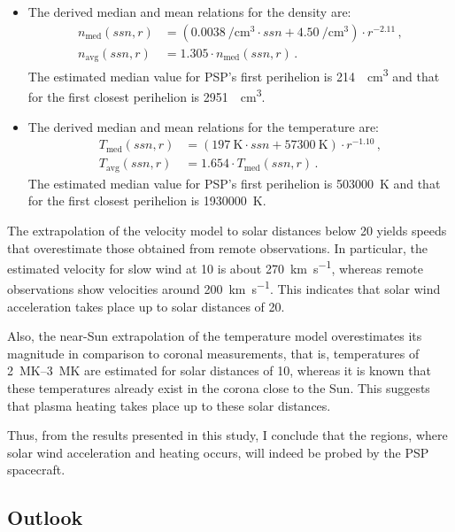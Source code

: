 \begin{itemize}
	\item The derived median and mean relations for the density are:
	\begin{align*}
		n_\text{med}(ssn,r) &= \left(\SI{0.0038}{\per\cm\cubed} \cdot ssn + \SI{4.50}{\per\cm\cubed}\right) \cdot r^{-2.11}	\,,\\
		n_\text{avg}(ssn,r) &= 1.305 \cdot n_\text{med}(ssn,r)	\,.
	\end{align*}
	 The estimated median value for PSP's first perihelion is \SI{214}{\per\cm\cubed} and that for the first closest perihelion is \SI{2951}{\per\cm\cubed}.
	
	\item The derived median and mean relations for the temperature are:
	\begin{align*}
		T_\text{med}(ssn,r) &= (\SI{197}{\K} \cdot ssn + \SI{57300}{\K}) \cdot r^{-1.10}	\,,\\
		T_\text{avg}(ssn,r) &= 1.654 \cdot T_\text{med}(ssn,r)\,.
	\end{align*}
	 The estimated median value for PSP's first perihelion is \SI{503000}{\kelvin} and that for the first closest perihelion is \SI{1930000}{\kelvin}.
\end{itemize}

\bigskip

The extrapolation of the velocity model to solar distances below \SI{20}{\Rs} yields speeds that overestimate those obtained from remote observations. In particular, the estimated velocity for slow wind at \SI{10}{\Rs} is about \SI{270}{\km\per\s}, whereas remote observations show velocities around \SI{200}{\km\per\s}. This indicates that solar wind acceleration takes place up to solar distances of \SI{20}{\Rs}.

Also, the near-Sun extrapolation of the temperature model overestimates its magnitude in comparison to coronal measurements, that is, temperatures of \SIrange{2}{3}{\mega\kelvin} are estimated for solar distances of \SI{10}{\Rs}, whereas it is known that these temperatures already exist in the corona close to the Sun. This suggests that plasma heating takes place up to these solar distances.

Thus, from the results presented in this study, I conclude that the regions, where solar wind acceleration and heating occurs, will indeed be probed by the PSP spacecraft.


\subsection*{Outlook}

